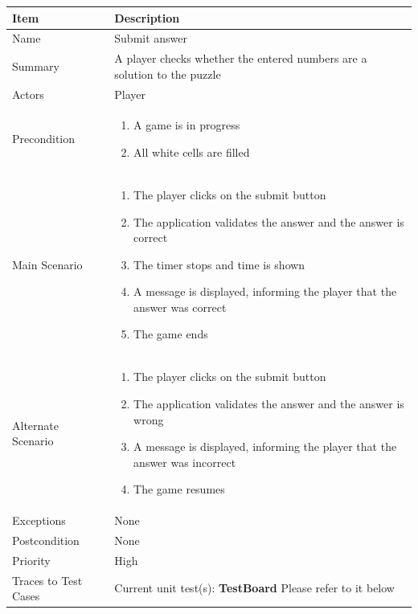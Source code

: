 \documentclass[12pt]{article}
\begin{document}
\begin{center}
\setlength{\tabcolsep}{16pt}
\renewcommand{\arraystretch}{1.1}
\begin{tabular}{ |p{3.4cm}|p{10cm}| }
    \hline
    \textbf{Item} & \textbf{Description} \\
    \hline
    Name & Submit answer \\
    \hline
    Summary & A player checks whether the entered numbers are a solution to the puzzle \\
    \hline
    Actors & Player \\
    \hline
    Precondition & 
    \vspace*{-0.1in}
    \begin{enumerate}[leftmargin=0.2in]
    \item A game is in progress
    \item All white cells are filled
    \end{enumerate}  \\
    \hline
    Main Scenario &     
    \vspace*{-0.1in}
    \begin{enumerate}[leftmargin=0.2in]
    \item The player clicks on the submit button
    \item The application validates the answer and the answer is correct
    \item The timer stops and time is shown
    \item A message is displayed, informing the player that the answer was correct
    \item The game ends
    \end{enumerate}  \\
    \hline
    Alternate Scenario & 
    \vspace*{-0.1in}
    \begin{enumerate}[leftmargin=0.2in]
    \item The player clicks on the submit button
    \item The application validates the answer and the answer is wrong
    \item A message is displayed, informing the player that the answer was incorrect
    \item The game resumes
    \end{enumerate}  \\
    \hline
    Exceptions &  None \\
    \hline
    Postcondition & None \\
    \hline
    Priority & High  \\
    \hline
    \small{Traces to Test Cases} & Current unit test(s): \textbf{TestBoard} \newline
    Please refer to it below  
    \\
    \hline
\end{tabular}
\end{center}
\end{document}
